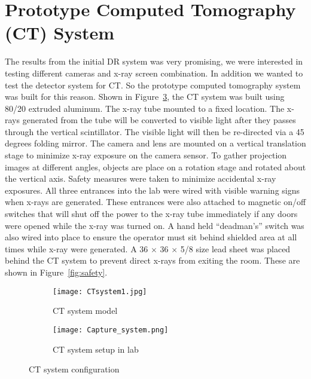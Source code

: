 \section{Prototype Computed Tomography (CT) System}
The results from the initial DR system was very promising, we were interested in testing different cameras and x-ray screen combination.  In addition we wanted to test the detector system for CT.  So the prototype computed tomography system was built for this reason.  Shown in Figure~\ref{fig:CTsystem}, the CT system was built using 80/20 extruded aluminum.  The x-ray tube mounted to a fixed location.  The x-rays generated from the tube will be converted to visible light after they passes through the vertical scintillator.  The visible light will then be re-directed via a 45 degrees folding mirror.  The camera and lens are mounted on a vertical translation stage to minimize x-ray exposure on the camera sensor.  To gather projection images at different angles, objects are place on a rotation stage and rotated about the vertical axis.  Safety measures were taken to minimize accidental x-ray exposures.  All three entrances into the lab were wired with visible warning signs when x-rays are generated.  These entrances were also attached to magnetic on/off switches that will shut off the power to the x-ray tube immediately if any doors were opened while the x-ray was turned on.  A hand held ``deadman's'' switch was also wired into place to ensure the operator must sit behind shielded area at all times while x-ray were generated.  A 36 \inches $\times$ 36 \inches $\times$ 5/8 \inches size lead sheet was placed behind the CT system to prevent direct x-rays from exiting the room.  These are shown in Figure~\ref{fig:safety}.

\begin{figure}
	\begin{subfigure}[b]{0.4\linewidth}
	\centering
	\texttt{[image: CTsystem1.jpg]}
	\caption{CT system model}
	\label{fig:CTmodel}
	\end{subfigure}
\hspace{0.2cm}
	\begin{subfigure}[b]{0.4\linewidth}
	\centering
	\texttt{[image: Capture\_system.png]}
	\caption{CT system setup in lab}
	\label{fig:CTlab}
	\end{subfigure}
\caption{CT system configuration}
\label{fig:CTsystem}
\end{figure}


